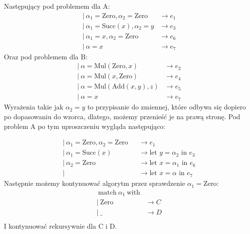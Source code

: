 \documentclass[a4paper,12pt]{book} %
\begin{document}
Następujący pod problemem dla A:
\begin{align*}
   & |\ \alpha_1 = \text{Zero}, \alpha_2 = \text{Zero} & \rightarrow e_1 \\
   & |\ \alpha_1 = \text{Succ}(x), \alpha_2 = y        & \rightarrow e_3 \\
   & |\ \alpha_1 = x, \alpha_2 = \text{Zero}           & \rightarrow e_6 \\
   & |\ \alpha = x                                     & \rightarrow e_7
\end{align*}
Oraz pod problemem dla B:
\begin{align*}
   & |\ \alpha = \text{Mul}(\text{Zero}, x)     & \rightarrow e_2 \\
   & |\ \alpha = \text{Mul}(x, \text{Zero})     & \rightarrow e_4 \\
   & |\ \alpha = \text{Mul}(\text{Add}(x,y), z) & \rightarrow e_5 \\
   & |\ \alpha = x                              & \rightarrow e_7
\end{align*}
Wyrażenia takie jak $\alpha_2=y$ to przypisanie do zmiennej, które odbywa się dopiero po dopasowaniu do wzorca, dlatego, możemy przenieść je na prawą stronę. Pod problem A po tym uproszczeniu wygląda następująco:

\begin{align*}
   & |\ \alpha_1 = \text{Zero}, \alpha_2 = \text{Zero} &  & \rightarrow e_1                                     \\
   & |\ \alpha_1 = \text{Succ}(x)                      &  & \rightarrow\text{let } y = \alpha_2 \text{ in }e_3  \\
   & |\ \alpha_2 = \text{Zero}                         &  & \rightarrow\text{let } x = \alpha_1 \text{ in } e_6 \\
   & |\                                                &  & \rightarrow\text{let } x = \alpha \text{ in } e_7
\end{align*}
Następnie możemy kontynuować algorytm przez sprawdzenie $\alpha_1=\text{Zero}$:
\begin{align*}
   & \ \text{match}\ \alpha_1\ \text{with}                 \\
   & |\  \text{Zero}                       & \rightarrow C \\
   & |\ \_                                 & \rightarrow D \\
\end{align*}
I kontynuować rekursywnie dla C i D.
\end{document}
